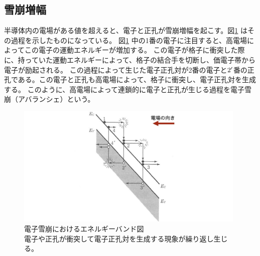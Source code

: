\subsection{雪崩増幅}
半導体内の電場がある値を超えると、電子と正孔が雪崩増幅を起こす。図\ref{fg:avalance} はその過程を示したものになっている。
図\ref{fg:avalance} 中の1番の電子に注目すると、高電場によってこの電子の運動エネルギーが増加する。
この電子が格子に衝突した際に、持っていた運動エネルギーによって、格子の結合手を切断し、価電子帯から電子が励起される。
この過程によって生じた電子正孔対が2番の電子と$\rm{2^\prime}$番の正孔である。この電子と正孔も高電場によって、格子に衝突し、電子正孔対を生成する。
このように、高電場によって連鎖的に電子と正孔が生じる過程を電子雪崩（アバランシェ）という。

\begin{figure}[h]
    \centering
    \includegraphics[width=11cm]{fig/ch3/avalance.jpeg}
    \caption[電子雪崩におけるエネルギーバンド図\cite{sze2012semiconductor}]{電子雪崩におけるエネルギーバンド図\cite{sze2012semiconductor}\\電子や正孔が衝突して電子正孔対を生成する現象が繰り返し生じる。}
    \label{fg:avalance}
\end{figure}

